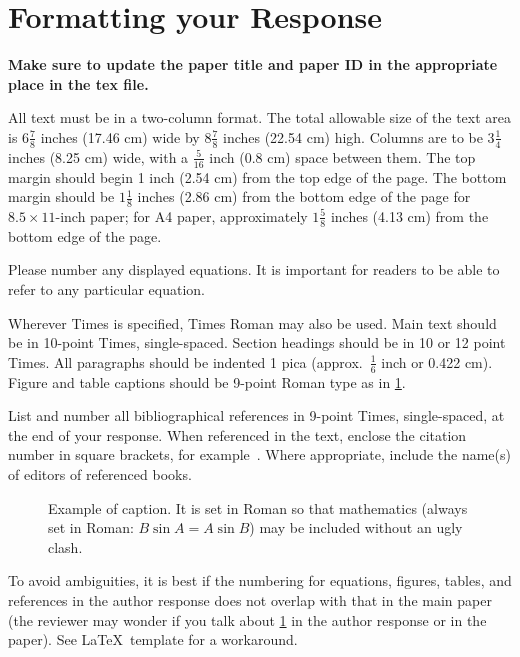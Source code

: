 \documentclass[10pt,twocolumn,letterpaper]{article}
\begin{document}
\section{Formatting your Response}

{\bf Make sure to update the paper title and paper ID in the appropriate place in the tex file.}

All text must be in a two-column format.
The total allowable size of the text area is $6\frac78$ inches (17.46 cm) wide by $8\frac78$ inches (22.54 cm) high.
Columns are to be $3\frac14$ inches (8.25 cm) wide, with a $\frac{5}{16}$ inch (0.8 cm) space between them.
The top margin should begin 1 inch (2.54 cm) from the top edge of the page.
The bottom margin should be $1\frac{1}{8}$ inches (2.86 cm) from the bottom edge of the page for $8.5 \times 11$-inch paper;
for A4 paper, approximately $1\frac{5}{8}$ inches (4.13 cm) from the bottom edge of the page.

Please number any displayed equations.
It is important for readers to be able to refer to any particular equation.

Wherever Times is specified, Times Roman may also be used.
Main text should be in 10-point Times, single-spaced.
Section headings should be in 10 or 12 point Times.
All paragraphs should be indented 1 pica (approx.~$\frac{1}{6}$ inch or 0.422 cm).
Figure and table captions should be 9-point Roman type as in \cref{fig:onecol}.


List and number all bibliographical references in 9-point Times, single-spaced,
at the end of your response.
When referenced in the text, enclose the citation number in square brackets, for example~\cite{Alpher05}.
Where appropriate, include the name(s) of editors of referenced books.

\begin{figure}[t]
  \centering
  \fbox{\rule{0pt}{0.5in} \rule{0.9\linewidth}{0pt}}
   \caption{Example of caption.  It is set in Roman so that mathematics
   (always set in Roman: $B \sin A = A \sin B$) may be included without an
   ugly clash.}
   \label{fig:onecol}
\end{figure}

To avoid ambiguities, it is best if the numbering for equations, figures, tables, and references in the author response does not overlap with that in the main paper (the reviewer may wonder if you talk about \cref{fig:onecol} in the author response or in the paper).
See \LaTeX\ template for a workaround.
\end{document}
